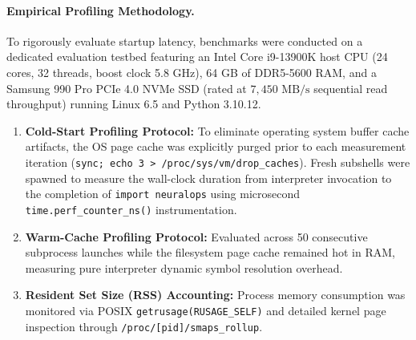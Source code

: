 \paragraph{Empirical Profiling Methodology.} To rigorously evaluate startup latency, benchmarks were conducted on a dedicated evaluation testbed featuring an Intel Core i9-13900K host CPU (24 cores, 32 threads, boost clock 5.8 GHz), 64 GB of DDR5-5600 RAM, and a Samsung 990 Pro PCIe 4.0 NVMe SSD (rated at $7{,}450\text{ MB/s}$ sequential read throughput) running Linux 6.5 and Python 3.10.12.
\begin{enumerate}
    \item \textbf{Cold-Start Profiling Protocol:} To eliminate operating system buffer cache artifacts, the OS page cache was explicitly purged prior to each measurement iteration (\texttt{sync; echo 3 > /proc/sys/vm/drop\_caches}). Fresh subshells were spawned to measure the wall-clock duration from interpreter invocation to the completion of \texttt{import neuralops} using microsecond \texttt{time.perf\_counter\_ns()} instrumentation.
    \item \textbf{Warm-Cache Profiling Protocol:} Evaluated across 50 consecutive subprocess launches while the filesystem page cache remained hot in RAM, measuring pure interpreter dynamic symbol resolution overhead.
    \item \textbf{Resident Set Size (RSS) Accounting:} Process memory consumption was monitored via POSIX \texttt{getrusage(RUSAGE\_SELF)} and detailed kernel page inspection through \texttt{/proc/[pid]/smaps\_rollup}.
\end{enumerate}

